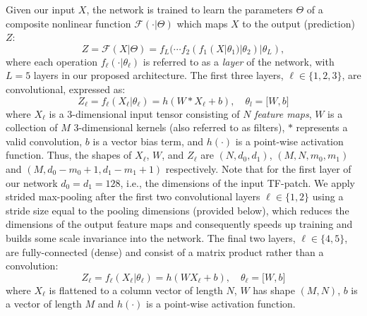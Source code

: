 \documentclass[journal,pdf]{IEEEtran}
\begin{document}
Given our input $X$, the network is trained to learn the parameters $\Theta$ of a composite nonlinear function $\mathcal{F}(\cdot|\Theta)$ which maps $X$ to the output (prediction) $Z$:
\begin{equation}
Z = \mathcal{F}(X|\Theta) = f_L(\cdots f_2(f_1(X|\theta_1)|\theta_2)|\theta_L),
\end{equation}
where each operation $f_\ell(\cdot|\theta_\ell)$ is referred to as a \emph{layer} of the network, with $L=5$ layers in our proposed architecture. The first three layers, $\ell\in\{1,2,3\}$, are convolutional, expressed as:
\begin{equation}
Z_\ell = f_\ell(X_\ell|\theta_\ell) = h(W \ast X_\ell + b),\quad\theta{}_l=\lbrack W,b\rbrack
\end{equation}
where $X_\ell$ is a 3-dimensional input tensor consisting of $N$ \emph{feature maps}, $W$ is a collection of $M$ 3-dimensional kernels (also referred to as filters), $\ast$ represents a valid convolution, $b$ is a vector bias term, and $h(\cdot)$ is a point-wise activation function. Thus, the shapes of $X_\ell$, $W$, and $Z_\ell$ are $(N, d_0, d_1)$, $(M, N, m_0, m_1)$ and $(M, d_0-m_0+1, d_1-m_1+1)$ respectively. Note that for the first layer of our network $d_0 = d_1 = 128$, i.e., the dimensions of the input TF-patch. 
We apply strided
max-pooling after the first two convolutional layers $\ell\in\{1,2\}$
using a stride size equal to the pooling dimensions (provided below),
which reduces the dimensions of the output feature maps and consequently speeds up training and builds some scale invariance into the network. The final two layers, $\ell\in\{4,5\}$, are fully-connected (dense) and consist of a matrix product rather than a convolution:
\begin{equation}
Z_\ell =  f_\ell(X_\ell|\theta_\ell) = h(WX_\ell+b),\quad \theta_\ell=\lbrack W,b\rbrack
\end{equation}
where $X_\ell$ is flattened to a column vector of length $N$, $W$ has shape $(M, N)$, $b$ is a vector of length $M$ and $h(\cdot)$ is a point-wise activation function.
\end{document}
